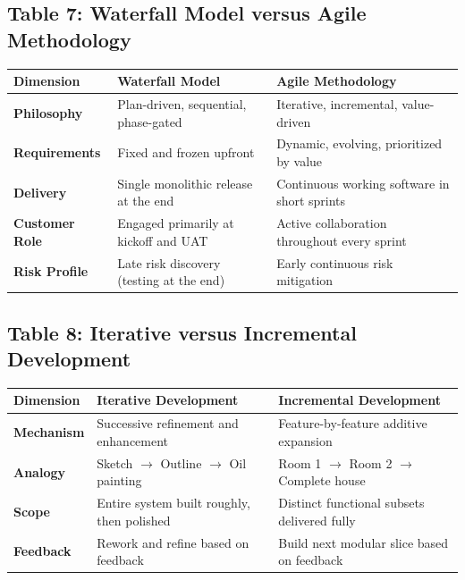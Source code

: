 \subsection*{Table 7: Waterfall Model versus Agile Methodology}
\begin{center}
\small
\begin{tabularx}{\textwidth}{lXX}
\toprule
\textbf{Dimension} & \textbf{Waterfall Model} & \textbf{Agile Methodology} \\
\midrule
\textbf{Philosophy} & Plan-driven, sequential, phase-gated & Iterative, incremental, value-driven \\
\textbf{Requirements} & Fixed and frozen upfront & Dynamic, evolving, prioritized by value \\
\textbf{Delivery} & Single monolithic release at the end & Continuous working software in short sprints \\
\textbf{Customer Role} & Engaged primarily at kickoff and UAT & Active collaboration throughout every sprint \\
\textbf{Risk Profile} & Late risk discovery (testing at the end) & Early continuous risk mitigation \\
\bottomrule
\end{tabularx}
\end{center}

\subsection*{Table 8: Iterative versus Incremental Development}
\begin{center}
\small
\begin{tabularx}{\textwidth}{lXX}
\toprule
\textbf{Dimension} & \textbf{Iterative Development} & \textbf{Incremental Development} \\
\midrule
\textbf{Mechanism} & Successive refinement and enhancement & Feature-by-feature additive expansion \\
\textbf{Analogy} & Sketch $\rightarrow$ Outline $\rightarrow$ Oil painting & Room 1 $\rightarrow$ Room 2 $\rightarrow$ Complete house \\
\textbf{Scope} & Entire system built roughly, then polished & Distinct functional subsets delivered fully \\
\textbf{Feedback} & Rework and refine based on feedback & Build next modular slice based on feedback \\
\bottomrule
\end{tabularx}
\end{center}

